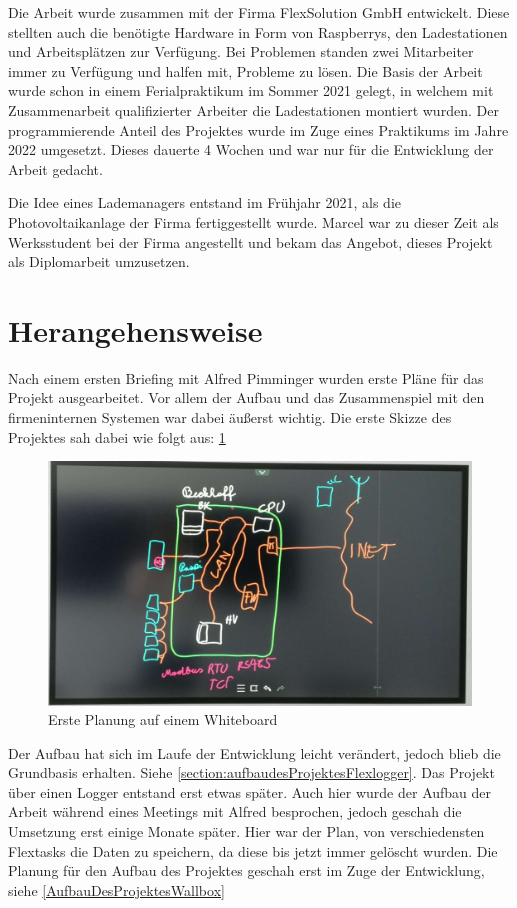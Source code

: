 Die Arbeit wurde zusammen mit der Firma FlexSolution GmbH entwickelt. Diese stellten auch die benötigte Hardware in Form von Raspberrys, den Ladestationen und Arbeitsplätzen zur Verfügung. Bei Problemen standen zwei Mitarbeiter immer zu Verfügung und halfen mit, Probleme zu lösen. Die Basis der Arbeit wurde schon in einem Ferialpraktikum im Sommer 2021 gelegt, in welchem mit Zusammenarbeit qualifizierter Arbeiter die Ladestationen montiert wurden. Der programmierende Anteil des Projektes wurde im Zuge eines Praktikums im Jahre 2022 umgesetzt. Dieses dauerte 4 Wochen und war nur für die Entwicklung der Arbeit gedacht.

Die Idee eines Lademanagers entstand im Frühjahr 2021, als die Photovoltaikanlage der Firma fertiggestellt wurde. Marcel war zu dieser Zeit als Werksstudent bei der Firma angestellt und bekam das Angebot, dieses Projekt als Diplomarbeit umzusetzen.

\section{Herangehensweise}

Nach einem ersten Briefing mit Alfred Pimminger wurden erste Pläne für das Projekt ausgearbeitet. Vor allem der Aufbau und das Zusammenspiel mit den firmeninternen Systemen war dabei äußerst wichtig. Die erste Skizze des Projektes sah dabei wie folgt aus: 
\ref{fig:impl:ersteSkizze}

\begin{figure}[h t]
  \centering
  \includegraphics[scale=0.15]{pics/ersteSkizze.jpg}
  \caption{Erste Planung auf einem Whiteboard}
  \label{fig:impl:ersteSkizze}
\end{figure}
 

Der Aufbau hat sich im Laufe der Entwicklung leicht verändert, jedoch blieb die Grundbasis erhalten. Siehe \ref{section:aufbaudesProjektesFlexlogger}. Das Projekt über einen Logger entstand erst etwas später. Auch hier wurde der Aufbau der Arbeit während eines Meetings mit Alfred besprochen, jedoch geschah die Umsetzung erst einige Monate später. Hier war der Plan, von verschiedensten Flextasks die Daten zu speichern, da diese bis jetzt immer gelöscht wurden. Die Planung für den Aufbau des Projektes geschah erst im Zuge der Entwicklung, siehe \ref{AufbauDesProjektesWallbox} 
 
